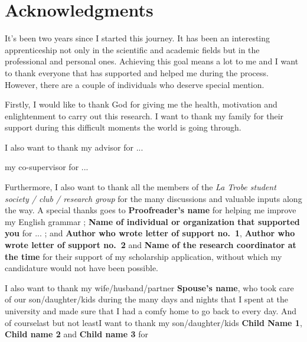 \chapter*{Acknowledgments}

It’s been two years since I started this journey. It has been an interesting apprenticeship not only in the scientific and academic fields but in the professional and personal ones. Achieving this goal means a lot to me and I want to thank everyone that has supported and helped me during the process. However, there are a couple of individuals who deserve special mention.

Firstly, I would like to thank God for giving me the health, motivation and enlightenment to carry out this research. I want to thank my family for their support during this difficult moments the world is going through.

I also want to thank my advisor \textbf{\myProfFirstName} \textbf{\myProfLastName} for ... 

 my co-supervisor \textbf{\myOtherProfTitle} \textbf{\myOtherProfFirstName} \textbf{\myOtherProfLastName} for ... 

Furthermore, I also want to thank all the members of the \emph{La Trobe student society / club / research group}  for the many discussions and valuable inputs along the way. A special thanks goes to \textbf{Proofreader's name} for helping me improve my English grammar ; \textbf{Name of individual or organization that supported you} for ... ; and \textbf{Author who wrote letter of support no.~1}, \textbf{Author who wrote letter of support no.~2} and \textbf{Name of the research coordinator at the time} for their support of my scholarship application, without which my candidature would not have been possible.

I also want to thank my wife/husband/partner \textbf{Spouse's name}, who took care of our son/daughter/kids during the many days and nights that I spent at the university and made sure that I had a comfy home to go back to every day. And of course\textemdash{}last but not least\textemdash{}I want to thank my son/daughter/kids \textbf{Child Name 1}, \textbf{Child name 2} and \textbf{Child name 3} for 

